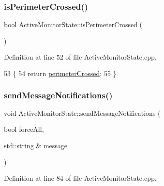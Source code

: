 \mbox{\label{class_active_monitor_state_a4566e7e96a777df86ab78ec326b551d0}} 
\subsubsection{\texorpdfstring{is\+Perimeter\+Crossed()}{isPerimeterCrossed()}}
{\footnotesize\ttfamily bool Active\+Monitor\+State\+::is\+Perimeter\+Crossed (\begin{DoxyParamCaption}{ }\end{DoxyParamCaption})}



Definition at line 52 of file Active\+Monitor\+State.\+cpp.


\begin{DoxyCode}
53 \{
54     \textcolor{keywordflow}{return} \hyperlink{class_active_monitor_state_af4c93e1be350ea9cf4ac97f97abaf79e}{perimeterCrossed};
55 \}
\end{DoxyCode}
\mbox{\label{class_active_monitor_state_aae5b3a425c74e7017446be277d69c06d}} 
\subsubsection{\texorpdfstring{send\+Message\+Notifications()}{sendMessageNotifications()}}
{\footnotesize\ttfamily void Active\+Monitor\+State\+::send\+Message\+Notifications (\begin{DoxyParamCaption}\item[{bool}]{force\+All,  }\item[{std\+::string \&}]{message }\end{DoxyParamCaption})\hspace{0.3cm}{\ttfamily [private]}}



Definition at line 84 of file Active\+Monitor\+State.\+cpp.


